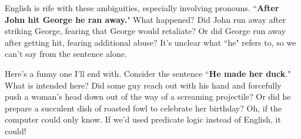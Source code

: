 English is rife with these ambiguities, especially involving pronouns.
``\textbf{After John hit George he ran away.}" What happened? Did John run away
after striking George, fearing that George would retaliate? Or did George
run away after getting hit, fearing additional abuse? It's unclear what
``he" refers to, so we can't say from the sentence alone. 

Here's a funny one I'll end with. Consider the sentence ``\textbf{He made her
duck}." What is intended here? Did some guy reach out with his hand and
forcefully push a woman's head down out of the way of a screaming projectile?
Or did he prepare a succulent dish of roasted fowl to celebrate her birthday?
Oh, if the computer could only know. If we'd used predicate logic instead of
English, it could!



